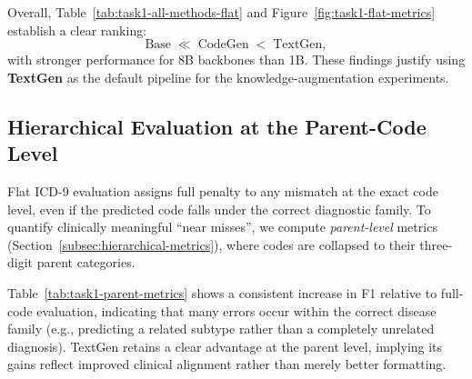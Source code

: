 Overall, Table~\ref{tab:task1-all-methods-flat} and Figure~\ref{fig:task1-flat-metrics} establish a clear ranking:
\[
\text{Base} \;\ll\; \text{CodeGen} \;<\; \text{TextGen},
\]
with stronger performance for 8B backbones than 1B. These findings justify using \textbf{TextGen} as the default pipeline for the knowledge-augmentation experiments.

\subsection{Hierarchical Evaluation at the Parent-Code Level}
\label{subsec:results-task1-hierarchical}

Flat ICD-9 evaluation assigns full penalty to any mismatch at the exact code level, even if the predicted code falls under the correct diagnostic family. To quantify clinically meaningful ``near misses'', we compute \emph{parent-level} metrics (Section~\ref{subsec:hierarchical-metrics}), where codes are collapsed to their three-digit parent categories.

Table~\ref{tab:task1-parent-metrics} shows a consistent increase in F1 relative to full-code evaluation, indicating that many errors occur within the correct disease family (e.g., predicting a related subtype rather than a completely unrelated diagnosis). TextGen retains a clear advantage at the parent level, implying its gains reflect improved clinical alignment rather than merely better formatting.

